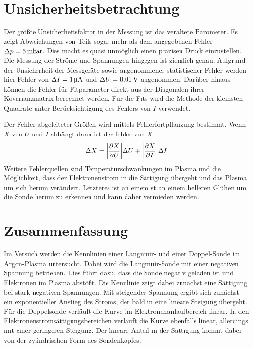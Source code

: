 \section{Unsicherheitsbetrachtung}
Der gr\"o\ss te Unsicherheitsfaktor in der Messung ist das veraltete Barometer.
Es zeigt Abweichungen von Teils sogar mehr als dem angegebenen Fehler $\Delta p=\SI{5}{\milli\bar}$.
Dies macht es quasi unm\"oglich einen pr\"azisen Druck einzustellen.
Die Messung der Str\"ome und Spannungen hingegen ist ziemlich genau.
Aufgrund der Unsicherheit der Messger\"ate sowie angenommener statistischer Fehler werden hier Fehler von $\Delta I=\SI{1}{\micro\ampere}$ und $\Delta U=\SI{0.01}{\volt}$ angenommen.
Dar\"uber hinaus k\"onnen die Fehler f\"ur Fitparameter direkt aus der Diagonalen ihrer Kovarianzmatrix berechnet werden.
F\"ur die Fits wird die Methode der kleinsten Quadrate unter Ber\"ucksichtigung des Fehlers von $I$ verwendet.

Der Fehler abgeleiteter Gr\"o\ss en wird mittels Fehlerfortpflanzung bestimmt.
Wenn $X$ von $U$ und $I$ abh\"angt dann ist der fehler von $X$
\begin{equation}
\Delta X = \abs{\frac{\partial X}{\partial U}}\Delta U +  \abs{\frac{\partial X}{\partial I}}\Delta I
\end{equation}
Weitere Fehlerquellen sind Temperaturschwankungen im Plasma und die M\"oglichkeit, dass der Elektronenstrom in die S\"attigung \"ubergeht und das Plasma um sich herum ver\"andert.
Letzteres ist an einem st an einem helleren Gl\"uhen um die Sonde herum zu erkennen und kann daher vermieden werden.

\section{Zusammenfassung}
Im Versuch werden die Kennlinien einer Langmuir- und einer Doppel-Sonde im Argon-Plasma untersucht.
Dabei wird die Langmuir-Sonde mit einer negativen Spannung betrieben.
Dies f\"uhrt dazu, dass die Sonde negativ geladen ist und Elektronen im Plasma abst\"o\ss t.
Die Kennlinie zeigt dabei zun\"achst eine S\"attigung bei stark negativen Spannungen.
Mit steigender Spannung ergibt sich zun\"achst ein exponentieller Anstieg des Stroms, der bald in eine lineare Steigung \"ubergeht.
F\"ur die Doppelsonde verl\"auft die Kurve im Elektronenanlaufbereich linear.
In den Elektronenstroms\"attigungsbereichen verl\"auft die Kurve ebenfalls linear, allerdings mit einer geringeren Steigung.
Der lineare Anteil in der S\"attigung kommt dabei von der zylindrischen Form des Sondenkopfes.

